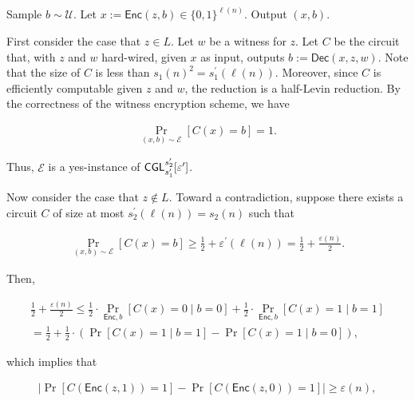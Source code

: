 \documentclass[10pt,a4paper]{article}
\begin{document}
Sample $b\sim\mathcal{U}$. Let $x:={\mathsf{Enc}}(z,b)\in\{0,1\}^{\ell(n)}$. Output $(x,b)$.\par





First consider the case that $z\in L$. Let $w$ be a witness for $z$. Let $C$ be the circuit that, with $z$ and $w$ hard-wired, given $x$ as input, outputs $b:={\mathsf{Dec}}(x,z,w)$. Note that the size of $C$ is less than $s_{1}(n)^{2}=s^{\prime}_{1}(\ell(n))$. Moreover, since $C$ is efficiently computable given $z$ and $w$, the reduction is a half-Levin reduction. By the correctness of the witness encryption scheme, we have\par


\[\begin{gathered}
\Pr_{(x,b)\sim\mathcal{E}}[C(x)=b]=1.
\end{gathered}\]


Thus, $\mathcal{E}$ is a yes-instance of ${\sf CGL}_{s_{1}^{\prime}}^{s_{2}^{\prime}}[\varepsilon^{\prime}]$.\par




Now consider the case that $z\notin L$. Toward a contradiction, suppose there exists a circuit $C$ of size at most $s_{2}^{\prime}(\ell(n))=s_{2}(n)$ such that\par


\[\begin{gathered}
\Pr_{(x,b)\sim\mathcal{E}}[C(x)=b]\geq\frac{1}{2}+\varepsilon^{\prime}(\ell(n))=\frac{1}{2}+\frac{\varepsilon(n)}{2}.
\end{gathered}\]


Then,\par


\[\begin{gathered}
\displaystyle\frac{1}{2}+\frac{\varepsilon(n)}{2} \displaystyle\leq\frac{1}{2}\cdot\Pr_{{\mathsf{Enc}},b}[C(x)=0\mid b=0]+\frac{1}{2}\cdot\Pr_{{\mathsf{Enc}},b}[C(x)=1\mid b=1] \\
\displaystyle=\frac{1}{2}+\frac{1}{2}\cdot\left(\Pr[C(x)=1\mid b=1]-\Pr[C(x)=1\mid b=0]\right),
\end{gathered}\]


which implies that\par


\[\begin{gathered}
\left|\Pr[C({\mathsf{Enc}}(z,1))=1]-\Pr[C({\mathsf{Enc}}(z,0))=1]\right|\geq\varepsilon({n}),
\end{gathered}\]
\end{document}
